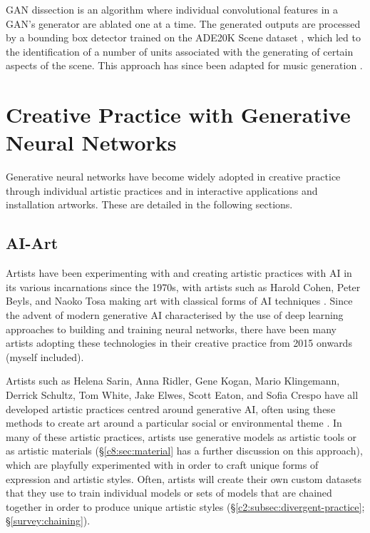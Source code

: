GAN dissection \citep{Bau2018-td} is an algorithm where individual convolutional features in a GAN's generator are ablated one at a time.
The generated outputs are processed by a bounding box detector trained on the ADE20K Scene dataset \citep{zhou2017scene}, which led to the identification of a number of units associated with the generating of certain aspects of the scene. 
This approach has since been adapted for music generation \citep{Brink2019-gc}. 

\section{Creative Practice with Generative Neural Networks}

Generative neural networks have become widely adopted in creative practice through individual artistic practices and in interactive applications and installation artworks. 
These are detailed in the following sections.

\subsection{AI-Art} 

Artists have been experimenting with and creating artistic practices with AI in its various incarnations since the 1970s, with artists such as Harold Cohen, Peter Beyls, and Naoko Tosa making art with classical forms of AI techniques \citep{grba2022deep}. 
Since the advent of modern generative AI characterised by the use of deep learning approaches to building and training neural networks, there have been many artists adopting these technologies in their creative practice from 2015 onwards (myself included). 

Artists such as Helena Sarin, Anna Ridler, Gene Kogan, Mario Klingemann, Derrick Schultz, Tom White, Jake Elwes, Scott Eaton, and Sofia Crespo have all developed artistic practices centred around generative AI, often using these methods to create art around a particular social or environmental theme \citep{grba2022deep}. 
In many of these artistic practices, artists use generative models as artistic tools or as artistic materials (\S \ref{c8:sec:material} has a further discussion on this approach), which are playfully experimented with in order to craft unique forms of expression and artistic styles.
Often, artists will create their own custom datasets that they use to train individual models or sets of models that are chained together in order to produce unique artistic styles (\S \ref{c2:subsec:divergent-practice}; \S \ref{survey:chaining}).

